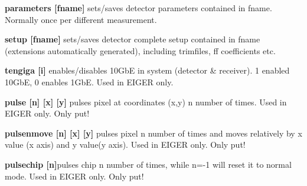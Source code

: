 \begin{DoxyItemize}
\item {\bfseries parameters \mbox{[}fname\mbox{]}} sets/saves detector parameters contained in fname. Normally once per different measurement.
\end{DoxyItemize}


\begin{DoxyItemize}
\item {\bfseries setup \mbox{[}fname\mbox{]}} sets/saves detector complete setup contained in fname (extensions automatically generated), including trimfiles, ff coefficients etc.
\end{DoxyItemize}


\begin{DoxyItemize}
\item {\bfseries tengiga \mbox{[}i\mbox{]}} enables/disables 10GbE in system (detector \& receiver). 1 enabled 10GbE, 0 enables 1GbE. Used in EIGER only.
\end{DoxyItemize}


\begin{DoxyItemize}
\item {\bfseries pulse \mbox{[}n\mbox{]} \mbox{[}x\mbox{]} \mbox{[}y\mbox{]}} pulses pixel at coordinates (x,y) n number of times. Used in EIGER only. Only put!
\end{DoxyItemize}


\begin{DoxyItemize}
\item {\bfseries pulsenmove \mbox{[}n\mbox{]} \mbox{[}x\mbox{]} \mbox{[}y\mbox{]}} pulses pixel n number of times and moves relatively by x value (x axis) and y value(y axis). Used in EIGER only. Only put!
\end{DoxyItemize}


\begin{DoxyItemize}
\item {\bfseries pulsechip \mbox{[}n\mbox{]}}pulses chip n number of times, while n=-\/1 will reset it to normal mode. Used in EIGER only. Only put! 
\end{DoxyItemize}